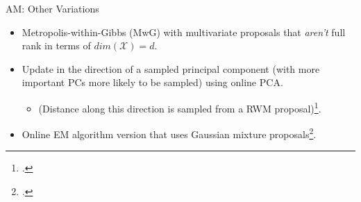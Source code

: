 \documentclass[aspectratio=169]{beamer}
\begin{document}
\begin{frame}{AM: Other Variations}
    \begin{itemize}%
        \item Metropolis-within-Gibbs (MwG) with multivariate proposals that \textit{aren't} full rank in terms of $dim(\mathcal{X}) = d$.
        \pause

        \item Update in the direction of a sampled principal component (with more important PCs more likely to be sampled) using online PCA.
        \pause

        \begin{itemize}
            \item(Distance along this direction is sampled from a RWM proposal)\footcite{andrieu_tutorial_2008}.
        \end{itemize}
        \pause

        \item Online EM algorithm version that uses Gaussian mixture proposals\footcite{andrieu_ergodicity_2006}.
    \end{itemize}

\end{frame}
\end{document}
